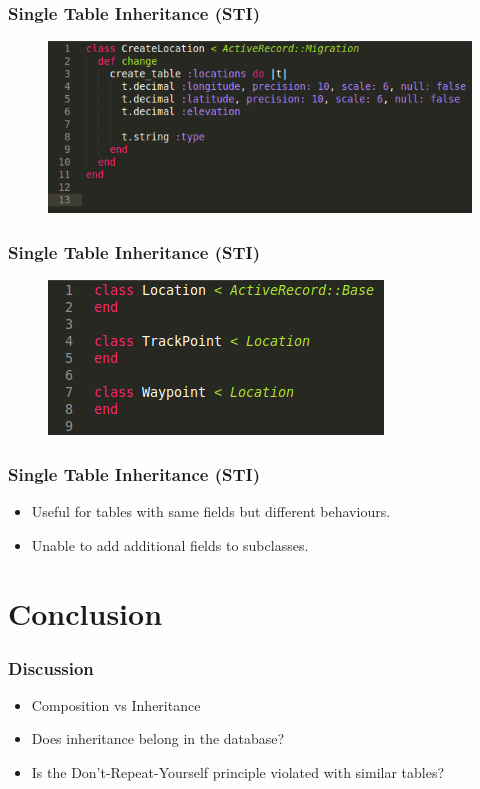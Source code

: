\documentclass{beamer}
\begin{document}
\begin{frame}
	\frametitle{Single Table Inheritance (STI)}
	\begin{figure}
		\centering
		\includegraphics[scale=0.5]{resources/rails/migration.png}
	\end{figure}
\end{frame}

\begin{frame}
	\frametitle{Single Table Inheritance (STI)}
	\begin{figure}
		\centering
		\includegraphics[scale=0.6]{resources/rails/classes.png}
	\end{figure}
\end{frame}

\begin{frame}
	\frametitle{Single Table Inheritance (STI)}
	
	\begin{itemize}
		\item Useful for tables with same fields but different behaviours.
		\item Unable to add additional fields to subclasses.
	\end{itemize}
\end{frame}

\section{Conclusion}

\begin{frame}
	\frametitle{Discussion}
	
	\begin{itemize}
		\item Composition vs Inheritance
		\item Does inheritance belong in the database?
		\item Is the Don't-Repeat-Yourself principle violated with similar tables?
	\end{itemize}

\end{frame}
\end{document}
